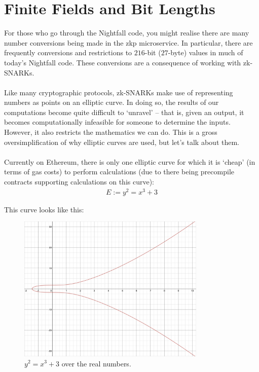 \section{Finite Fields and Bit Lengths}
\label{sec:finiteFieldsAndBitLengths}

\noindent
For those who go through the Nightfall code, you might realise there are many number conversions being made in the zkp microservice. In particular, there are frequently conversions and restrictions to $216$-bit ($27$-byte) values in much of today's Nightfall code. These conversions are a consequence of working with zk-SNARKs.\\
\\
Like many cryptographic protocols, zk-SNARKs make use of representing numbers as points on an elliptic curve. In doing so, the results of our computations become quite difficult to `unravel' -- that is, given an output, it becomes computationally infeasible for someone to determine the inputs. However, it also restricts the mathematics we can do. This is a gross oversimplification of why elliptic curves are used, but let's talk about them.\\
\\
Currently on Ethereum, there is only one elliptic curve for which it is `cheap' (in terms of gas costs) to perform calculations (due to there being precompile contracts supporting calculations on this curve):
\begin{align*}
    E := y^2 = x^3 + 3
\end{align*}

This curve looks like this:
\begin{figure}[H]
	\begin{center}
		\includegraphics[width=0.8\textwidth]{images/ellipticCurveReals.png}
	\end{center}
	\caption{$y^2 = x^3 + 3$ over the real numbers.}
	\label{pic:ftShield}
\end{figure}

